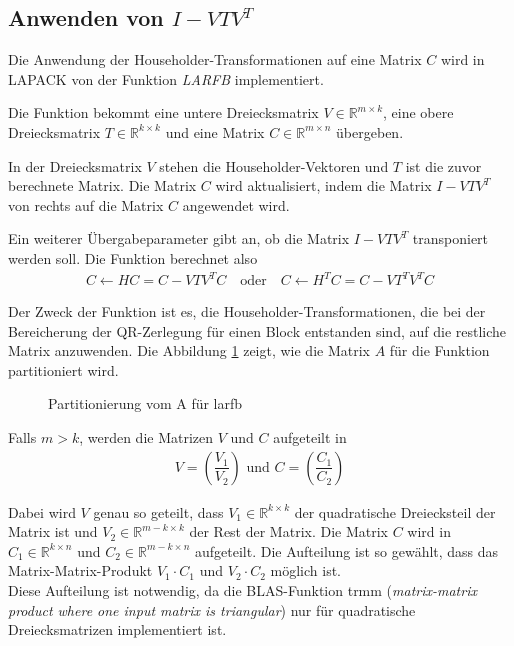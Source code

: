 \subsection{Anwenden von $I - VTV^T$}
Die Anwendung der Householder-Transformationen auf eine Matrix $C$ wird in LAPACK von der  Funktion \textit{LARFB} implementiert.

Die Funktion bekommt eine untere Dreiecksmatrix $V \in \mathbb{R}^{m \times k}$, eine obere Dreiecksmatrix $T \in \mathbb{R}^{k \times k}$ und eine Matrix $C \in \mathbb{R}^{m \times n }$ übergeben.

In der Dreiecksmatrix $V$ stehen die Householder-Vektoren und $T$ ist die zuvor berechnete Matrix.
Die Matrix $C$ wird aktualisiert, indem die Matrix $I - V T V^T $ von rechts auf die Matrix $ C $ angewendet wird. 

Ein weiterer Übergabeparameter gibt an, ob die Matrix  $I - V T V^T $ transponiert werden soll.
Die Funktion berechnet also
\begin{align}
	C \leftarrow H C = C - V T V^T C \quad \text{oder} \quad 	C \leftarrow H^T C = C - V T^T V^T C	\label{eq:larfb}
\end{align}

Der Zweck der Funktion ist es, die Householder-Transformationen, die bei der Bereicherung der QR-Zerlegung für einen Block entstanden sind, auf die restliche Matrix anzuwenden.
Die Abbildung \ref{fig:patrA} zeigt, wie die Matrix $A$ für die Funktion partitioniert wird.
\begin{figure} [H]
	\centering
	
	\caption{Partitionierung vom A für larfb}
	\label{fig:patrA}
\end{figure}
Falls $m > k $, werden die Matrizen $V$ und $C$ aufgeteilt in
\begin{align}
	V=\left(\dfrac{V_1}{V_2}\right)  \text{  und  } C=\left(\dfrac{C_1}{C_2}\right)
	\label{eq:aufteilen}
\end{align}

Dabei wird $V$ genau so geteilt, dass $V_1 \in \mathbb{R}^{k\times k}$ der quadratische Dreiecksteil der Matrix ist und $V_2 \in \mathbb{R}^{m-k\times k}$ der Rest der Matrix. Die Matrix $C$ wird in $C_1 \in \mathbb{R}^{k \times n}$ und $C_2 \in \mathbb{R}^{m-k \times n}$  aufgeteilt. Die Aufteilung ist so gewählt, dass das Matrix-Matrix-Produkt $V_1 \cdot C_1$ und $V_2 \cdot C_2$ möglich ist.\\
Diese Aufteilung ist notwendig, da die BLAS-Funktion trmm (\textit{matrix-matrix product where one input matrix is triangular}) nur für quadratische Dreiecksmatrizen implementiert ist.

